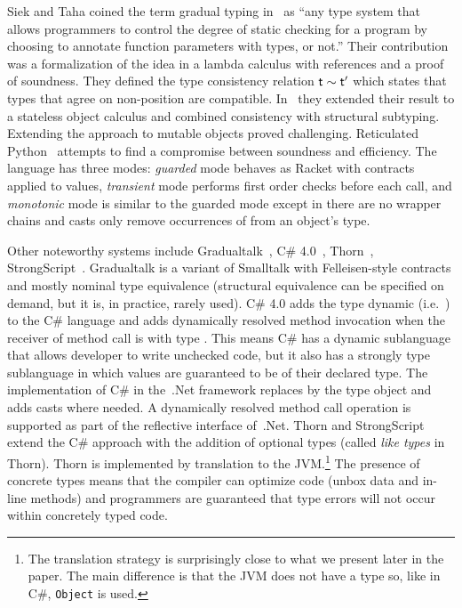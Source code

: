 \documentclass[a4paper,USenglish]{tex/lipics-v2016}
\newcommand{\code}[1]{{\tt #1}\xspace}
\begin{document}
Siek and Taha coined the term gradual typing in~\cite{SiekTaha06} as ``any
type system that allows programmers to control the degree of static checking
for a program by choosing to annotate function parameters with types, or
not.'' Their contribution was a formalization of the idea in a lambda
calculus with references and a proof of soundness. They defined the type
consistency relation $\t \sim \tp$ which states that types that agree on
non-\any position are compatible.  In~\cite{SiekTaha07} they extended their
result to a stateless object calculus and combined consistency with
structural subtyping. Extending the approach to mutable objects proved
challenging. Reticulated Python~\cite{siek14} attempts to find a compromise
between soundness and efficiency.  The language has three modes:
\emph{guarded} mode behaves as Racket with contracts applied to values,
\emph{transient} mode performs first order checks before each call, and
\emph{monotonic} mode is similar to the guarded mode except in there are no
wrapper chains and casts only remove occurrences of \any from an object's
type.

Other noteworthy systems include Gradualtalk~\cite{GS13}, C\#
4.0~\cite{Bierman10}, Thorn~\cite{oopsla09},
StrongScript~\cite{ecoop15}. Gradualtalk is a variant of Smalltalk with
Felleisen-style contracts and mostly nominal type equivalence (structural
equivalence can be specified on demand, but it is, in practice, rarely
used). C\# 4.0 adds the type {\sf dynamic} (i.e.~\any) to the C\# language
and adds dynamically resolved method invocation when the receiver of method
call is with type \any.  This means C\# has a dynamic sublanguage that allows
developer to write unchecked code, but it also has a strongly type
sublanguage in which values are guaranteed to be of their declared type.
The implementation of C\# in the~.Net framework replaces \any by the type
{\sf object} and adds casts where needed. A dynamically resolved method call
operation is supported as part of the reflective interface of~.Net.  Thorn
and StrongScript extend the C\# approach with the addition of optional types
(called {\em like types} in Thorn).  Thorn is implemented by translation to
the JVM.\footnote{The translation strategy is surprisingly close to what we
  present later in the paper. The main difference is that the JVM does not
  have a type \any so, like in C\#, \code{Object} is used.} The presence of
concrete types means that the compiler can optimize code (unbox data and
in-line methods) and programmers are guaranteed that type errors will not
occur within concretely typed code. 
\end{document}
